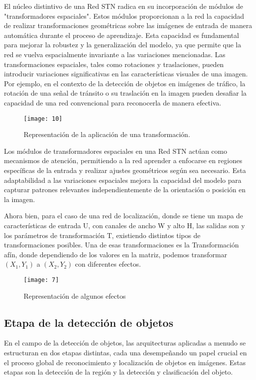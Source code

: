 	El núcleo distintivo de una Red STN radica en su incorporación de módulos de "transformadores espaciales". Estos módulos proporcionan a la red la capacidad de realizar transformaciones geométricas sobre las imágenes de entrada de manera automática durante el proceso de aprendizaje. Esta capacidad es fundamental para mejorar la robustez y la generalización del modelo, ya que permite que la red se vuelva espacialmente invariante a las variaciones mencionadas.
Las transformaciones espaciales, tales como rotaciones y traslaciones, pueden introducir variaciones significativas en las características visuales de una imagen. Por ejemplo, en el contexto de la detección de objetos en imágenes de tráfico, la rotación de una señal de tránsito o su traslación en la imagen pueden desafiar la capacidad de una red convencional para reconocerla de manera efectiva.
	
	\vspace{0.3cm}
	\begin{figure}[ht]
	    \centering
		\texttt{[image: 10]}
		\caption{Representación de la aplicación de una transformación.}
	\end{figure}
	\vspace{0.3cm}

	Los módulos de transformadores espaciales en una Red STN actúan como mecanismos de atención, permitiendo a la red aprender a enfocarse en regiones específicas de la entrada y realizar ajustes geométricos según sea necesario. Esta adaptabilidad a las variaciones espaciales mejora la capacidad del modelo para capturar patrones relevantes independientemente de la orientación o posición en la imagen.
	
	Ahora bien, para el caso de una red de localización, donde se tiene un mapa de características de entrada U, con canales de ancho W y alto H, las salidas son  y los parámetros de transformación T, existiendo distintos tipos de transformaciones posibles. Una de esas transformaciones es la Transformación afín, donde dependiendo de los valores en la matriz, podemos transformar $(X_1, Y_1)$ a $(X_2, Y_2)$ con diferentes efectos.

	\begin{figure}[ht]
	    \centering
		\texttt{[image: 7]}
		\caption{Representación de algunos efectos}
	\end{figure}
	
	\subsection{Etapa de la detección de objetos}
	En el campo de la detección de objetos, las arquitecturas aplicadas a menudo se estructuran en dos etapas distintas, cada una desempeñando un papel crucial en el proceso global de reconocimiento y localización de objetos en imágenes. Estas etapas son la detección de la región y la detección y clasificación del objeto.

